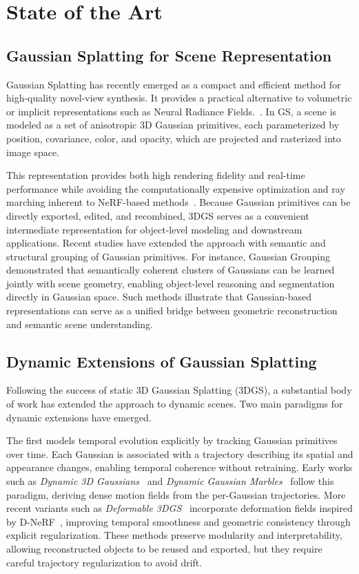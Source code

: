\chapter{State of the Art}

\section{Gaussian Splatting for Scene Representation}

Gaussian Splatting has recently emerged as a compact and efficient method for high-quality novel-view synthesis. It provides a practical alternative to volumetric or implicit representations such as Neural Radiance Fields.~\cite{mildenhall2021nerf,barron2021mip,barron2023zipnerf}. 
In GS, a scene is modeled as a set of anisotropic 3D Gaussian primitives, each parameterized by position, covariance, color, and opacity, which are projected and rasterized into image space. 

This representation provides both high rendering fidelity and real-time performance while avoiding the computationally expensive optimization and ray marching inherent to NeRF-based methods~\cite{kerbl3Dgaussians}. 
Because Gaussian primitives can be directly exported, edited, and recombined, 3DGS serves as a convenient intermediate representation for object-level modeling and downstream applications.
Recent studies have extended the approach with semantic and structural grouping of Gaussian primitives.
For instance, Gaussian Grouping~\cite{gaussian_grouping} demonstrated that semantically coherent clusters of Gaussians can be learned jointly with scene geometry, enabling object-level reasoning and segmentation directly in Gaussian space.
Such methods illustrate that Gaussian-based representations can serve as a unified bridge between geometric reconstruction and semantic scene understanding.

\section{Dynamic Extensions of Gaussian Splatting}

Following the success of static 3D Gaussian Splatting (3DGS), a substantial body of work has extended the approach to dynamic scenes. 
Two main paradigms for dynamic extensions have emerged.

The first models temporal evolution explicitly by tracking Gaussian primitives over time. 
Each Gaussian is associated with a trajectory describing its spatial and appearance changes, enabling temporal coherence without retraining. 
Early works such as \textit{Dynamic 3D Gaussians}~\cite{luiten2024dynamic} and \textit{Dynamic Gaussian Marbles}~\cite{stearnsmarbels} follow this paradigm, deriving dense motion fields from the per-Gaussian trajectories. 
More recent variants such as \textit{Deformable 3DGS}~\cite{yang2024deformable} incorporate deformation fields inspired by D-NeRF~\cite{pumarola2021d}, improving temporal smoothness and geometric consistency through explicit regularization. 
These methods preserve modularity and interpretability, allowing reconstructed objects to be reused and exported, but they require careful trajectory regularization to avoid drift.

